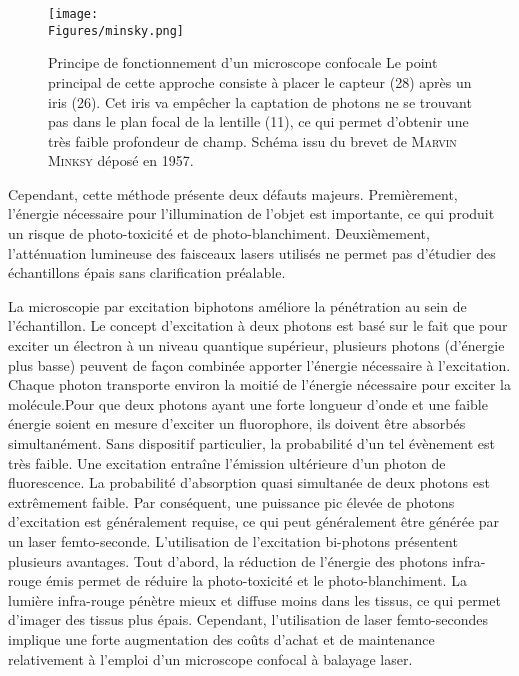 \documentclass[\main/main.tex]{subfiles}
\begin{document}
\begin{figure}[h!]{\textwidth} 
    \centering
       \centering \texttt{[image: \\Figures/minsky.png]}
       \caption{
            \label{fig:confocal}
            Principe de fonctionnement d'un microscope confocale
            \newline
            Le point principal de cette approche consiste à placer le capteur (28) après un iris (26).
            Cet iris va empêcher la captation de photons ne se trouvant pas dans le plan focal de la lentille (11), ce qui permet d'obtenir une très faible profondeur de champ.
            \newline
            Schéma issu du brevet de \textsc{Marvin Minksy} déposé en 1957.
            }
\end{figure}

%
Cependant, cette méthode présente deux défauts majeurs.
%
Premièrement, l'énergie nécessaire pour l'illumination de l'objet est importante, ce qui produit un risque de photo\hyp{}toxicité et de photo\hyp{}blanchiment. Deuxièmement, l'atténuation lumineuse des faisceaux lasers utilisés ne permet pas d'étudier des échantillons épais sans clarification préalable.

%
La microscopie par excitation biphotons améliore la pénétration au sein de l'échantillon.
%
Le concept d'excitation à deux photons est basé sur le fait que pour exciter un électron à un niveau quantique supérieur, plusieurs photons (d’énergie plus basse) peuvent de façon combinée apporter l’énergie nécessaire à l’excitation. Chaque photon transporte environ la moitié de l'énergie nécessaire pour exciter la molécule.Pour que deux photons ayant une forte longueur d'onde et une faible énergie soient en mesure d'exciter un fluorophore, ils doivent être absorbés simultanément. Sans dispositif particulier, la probabilité d'un tel évènement est très faible.  Une excitation entraîne l'émission ultérieure d'un photon de fluorescence. La probabilité d'absorption quasi simultanée de deux photons est extrêmement faible. Par conséquent, une puissance pic élevée de photons d'excitation est généralement requise, ce qui peut généralement être générée par un laser femto\hyp{}seconde.
%
L'utilisation de l'excitation bi-photons présentent plusieurs avantages. Tout d'abord, la réduction de l'énergie des photons infra-rouge émis permet de réduire la photo-toxicité et le photo-blanchiment.
%
La lumière infra-rouge pénètre mieux et diffuse moins dans les tissus, ce qui permet d'imager des tissus plus épais.
%
Cependant, l'utilisation de laser femto\hyp{}secondes implique une forte augmentation des coûts d'achat et de maintenance relativement à l'emploi d'un microscope confocal à balayage laser.
\end{document}
